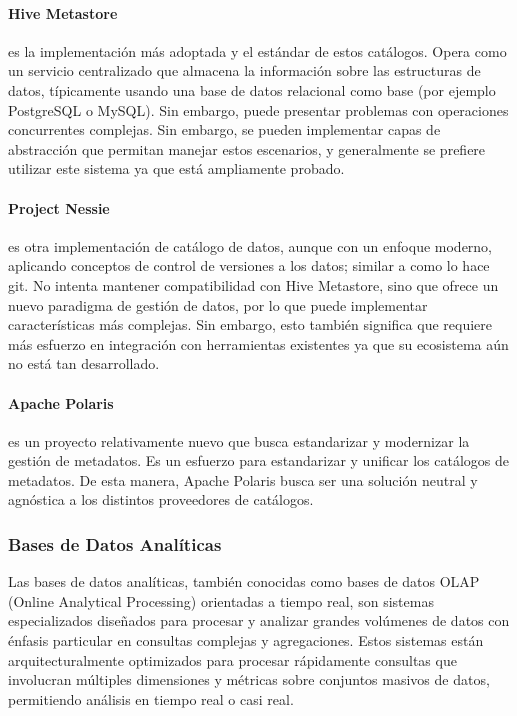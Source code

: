 \paragraph{Hive Metastore} es la implementación más adoptada y el estándar de estos catálogos. Opera como un servicio centralizado que almacena la información sobre las estructuras de datos,
típicamente usando una base de datos relacional como base (por ejemplo PostgreSQL o MySQL). Sin embargo, puede presentar problemas con operaciones concurrentes complejas. 
Sin embargo, se pueden implementar capas de abstracción que permitan manejar estos escenarios, y generalmente se prefiere utilizar este sistema ya que está ampliamente probado.

\paragraph{Project Nessie} es otra implementación de catálogo de datos, aunque con un enfoque moderno, aplicando conceptos de control de versiones a los datos; similar a como lo hace git. 
No intenta mantener compatibilidad con Hive Metastore, sino que ofrece un nuevo paradigma de gestión de datos, por lo que puede implementar características más complejas. 
Sin embargo, esto también significa que requiere más esfuerzo en integración con herramientas existentes ya que su ecosistema aún no está tan desarrollado.

\paragraph{Apache Polaris} es un proyecto relativamente nuevo que busca estandarizar y modernizar la gestión de metadatos. Es un esfuerzo para estandarizar y unificar los catálogos de metadatos.
De esta manera, Apache Polaris busca ser una solución neutral y agnóstica a los distintos proveedores de catálogos.  

\newpage

\subsubsection{Bases de Datos Analíticas}

Las bases de datos analíticas, también conocidas como bases de datos OLAP (Online Analytical Processing) orientadas a tiempo real, 
son sistemas especializados diseñados para procesar y analizar grandes volúmenes de datos con énfasis particular en consultas complejas y agregaciones. 
Estos sistemas están arquitecturalmente optimizados para procesar rápidamente consultas que involucran múltiples dimensiones y métricas sobre conjuntos masivos de datos, 
permitiendo análisis en tiempo real o casi real. 


